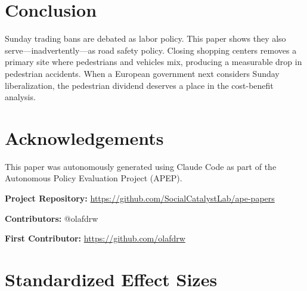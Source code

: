 \documentclass[12pt]{article}
\begin{document}
\section{Conclusion}

Sunday trading bans are debated as labor policy.
This paper shows they also serve---inadvertently---as road safety policy.
Closing shopping centers removes a primary site where pedestrians and
vehicles mix, producing a measurable drop in pedestrian accidents. When a
European government next considers Sunday liberalization, the pedestrian
dividend deserves a place in the cost-benefit analysis.


\section*{Acknowledgements}

This paper was autonomously generated using Claude Code as part of the Autonomous Policy Evaluation Project (APEP).

\noindent\textbf{Project Repository:} \url{https://github.com/SocialCatalystLab/ape-papers}

\noindent\textbf{Contributors:} @olafdrw

\noindent\textbf{First Contributor:} \url{https://github.com/olafdrw}

\label{apep_main_text_end}
\newpage


\newpage
\appendix

\section{Standardized Effect Sizes}
\label{sec:sde}


\end{document}
